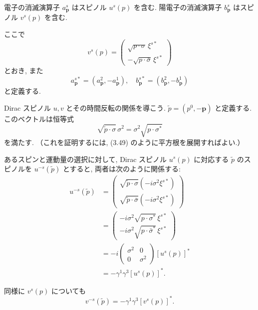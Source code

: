 \documentclass[a4paper,12pt]{article}
\begin{document}
電子の消滅演算子 $a^s_{\mathbf{p}}$ はスピノル $u^s(p)$ を含む.  
陽電子の消滅演算子 $b^s_{\mathbf{p}}$ はスピノル $v^s(p)$ を含む.  

ここで
\begin{equation}
v^s(p) = \begin{pmatrix}\sqrt{p\cdot\sigma}\,\xi^{s*} \\ -\sqrt{p\cdot\bar\sigma}\,\xi^{s*}\end{pmatrix}
\tag{3.136}
\end{equation}
とおき, また
\begin{equation}
a^{s*}_{\mathbf{p}}=(a^2_{\mathbf{p}},-a^1_{\mathbf{p}}), \quad
b^{s*}_{\mathbf{p}}=(b^2_{\mathbf{p}},-b^1_{\mathbf{p}})
\tag{3.137}
\end{equation}
と定義する.  

Dirac スピノル $u, v$ とその時間反転の関係を導こう.  
$\tilde{p}=(p^0,-\mathbf{p})$ と定義する.  
このベクトルは恒等式
\begin{equation*}
\sqrt{\tilde{p}\cdot\sigma}\,\sigma^2 = \sigma^2 \sqrt{p\cdot\sigma^*}
\end{equation*}
を満たす. （これを証明するには, (3.49) のように平方根を展開すればよい.）

あるスピンと運動量の選択に対して, Dirac スピノル $u^s(p)$ に対応する $\tilde{p}$ のスピノルを $u^{-s}(\tilde{p})$ とすると,  
両者は次のように関係する:
\begin{align*}
u^{-s}(\tilde{p}) &=
\begin{pmatrix}
\sqrt{\tilde{p}\cdot\sigma}(-i\sigma^2 \xi^{s*}) \\
\sqrt{\tilde{p}\cdot\bar\sigma}(-i\sigma^2 \xi^{s*})
\end{pmatrix} \\
&=
\begin{pmatrix}
- i\sigma^2 \sqrt{p\cdot\sigma^*}\,\xi^{s*} \\
- i\sigma^2 \sqrt{p\cdot\bar\sigma^*}\,\xi^{s*}
\end{pmatrix} \\
&= -i
\begin{pmatrix}
\sigma^2 & 0 \\ 0 & \sigma^2
\end{pmatrix}[u^s(p)]^* \\
&= -\gamma^1\gamma^3 [u^s(p)]^* .
\end{align*}

同様に $v^s(p)$ についても
\begin{equation*}
v^{-s}(\tilde{p}) = -\gamma^1\gamma^3 [v^s(p)]^* .
\end{equation*}
\end{document}
